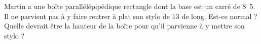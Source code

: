 
\begin{exercice}\label{exosmath-0114}

    Martin a une boîte parallélépipédique rectangle dont la base est un carré de \unit{8.5}{\centi\meter}. Il ne parvient pas à y faire rentrer à plat son stylo de \unit{13}{\centi\meter} de long. Est-ce normal ? Quelle devrait être la hauteur de la boîte pour qu'il parvienne à y mettre son stylo ?

\end{exercice}
